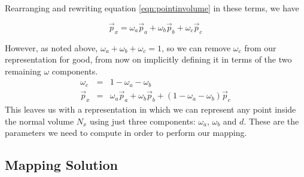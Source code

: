 Rearranging and rewriting equation \ref{eqn:pointinvolume} in these terms, we have

\begin{equation}
\vec{p}_x = \omega_a\vec{p}_a + \omega_b\vec{p}_b + \omega_c\vec{p}_c
\end{equation}

However, as noted above, $\omega_a + \omega_b + \omega_c = 1$, so we can remove $\omega_c$ from our representation for good, from now on implicitly defining it in terms of the two remaining $\omega$ components.
\begin{eqnarray} \label{eqn:nomoreomegat}
\omega_c & = & 1 - \omega_a - \omega_b \nonumber \\
\vec{p}_x & = & \omega_a\vec{p}_a + \omega_b\vec{p}_b + (1-\omega_a-\omega_b)\vec{p}_c
\end{eqnarray}
This leaves us with a representation in which we can represent any point inside the normal volume $N_x$ using just three components: $\omega_a$, $\omega_b$ and $d$. These are the parameters we need to compute in order to perform our mapping.

\subsection{\label{sec:scandata:pointtosurface:mappingsoln}Mapping Solution}

